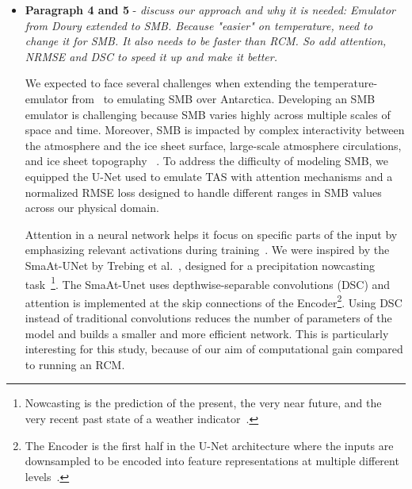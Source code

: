 \documentclass[a4paper,11pt,oneside]{report}
\begin{document}
\begin{itemize}

    \item \textbf{Paragraph 4 and 5} - \textit{discuss our approach and why it is needed: Emulator from Doury extended to SMB. Because "easier" on temperature, need to change it for SMB. It also needs to be faster than RCM. So add attention, NRMSE and DSC to speed it up and make it better.}
    
    We expected to face several challenges when extending the temperature-emulator from~\cite{Doury} to emulating SMB over Antarctica. Developing an SMB emulator is challenging because SMB varies highly across multiple scales of space and time. Moreover, SMB is impacted by complex interactivity between the atmosphere and the ice sheet surface, large-scale atmosphere circulations, and ice sheet topography ~\cite{Lenaerts2019}. To address the difficulty of modeling SMB, we equipped the U-Net used to emulate TAS with attention mechanisms and a normalized RMSE loss designed to handle different ranges in SMB values across our physical domain. 
    
    Attention in a neural network helps it focus on specific parts of the input by emphasizing relevant activations during training~\cite{Sanghyun2018, AttentionUNet, Oktay2018}. We were inspired by the SmaAt-UNet by Trebing et al.~\cite{smatunet}, designed for a precipitation nowcasting task~\footnote{Nowcasting is the prediction of the present, the very near future, and the very recent past state of a weather indicator~\cite{Nowcasting}.}. The SmaAt-Unet uses depthwise-separable convolutions (DSC) and attention is implemented at the skip connections of the Encoder\footnote{The Encoder is the first half in the U-Net architecture where the inputs are downsampled to be encoded into feature representations at multiple different levels~\cite{Encoder}.}. Using DSC instead of traditional convolutions reduces the number of parameters of the model and builds a smaller and more efficient network. This is particularly interesting for this study, because of our aim of computational gain compared to running an RCM.     
    

\end{itemize}
\end{document}
